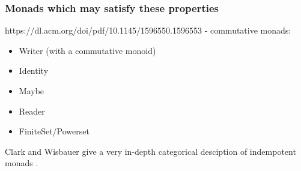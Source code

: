 \documentclass{article}
\begin{document}
\subsubsection{Monads which may satisfy these properties}

https://dl.acm.org/doi/pdf/10.1145/1596550.1596553 - commutative monads:
\begin{itemize}
	\item Writer (with a commutative monoid)
	\item Identity
	\item Maybe
	\item Reader
	\item FiniteSet/Powerset
\end{itemize}

Clark and Wisbauer give a very in-depth categorical desciption of indempotent monads \cite{indempotent_monads}.



\end{document}
